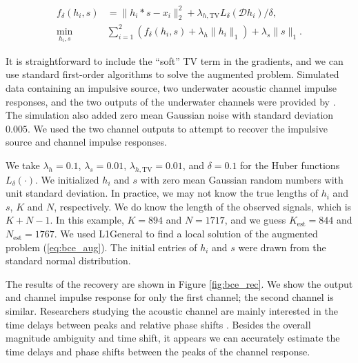 \documentclass[journal]{IEEEtran}
\begin{document}
\begin{align}
   \label{eq:bce_aug}
   f_\delta(h_i,s) &= \|h_i\ast s - x_i\|_2^2 + \lambda_{h,\text{TV}}L_\delta(\mathcal{D}h_i)/\delta,\nonumber\\
   \min_{h_i,s} ~&\sum_{i=1}^2\left(f_\delta(h_i,s) + \lambda_h\|h_i\|_1\right) + \lambda_s\|s\|_1.
\end{align}

It is straightforward to include the ``soft'' TV term in the gradients, and we can use standard first-order algorithms to solve the augmented problem.  Simulated data containing an impulsive source, two underwater acoustic channel impulse responses, and the two outputs of the underwater channels were provided by \cite{rideout_2016}.  The simulation also added zero mean Gaussian noise with standard deviation $0.005$.  We used the two channel outputs to attempt to recover the impulsive source and channel impulse responses.

We take $\lambda_h = 0.1$, $\lambda_s=0.01$, $\lambda_{h,\text{TV}}=0.01$, and $\delta=0.1$ for the Huber functions $L_\delta(\cdot)$.  We initialized $h_i$ and $s$ with zero mean Gaussian random numbers with unit standard deviation.  In practice, we may not know the true lengths of $h_i$ and $s$, $K$ and $N$, respectively.  We do know the length of the observed signals, which is $K+N-1$.  In this example, $K=894$ and $N=1717$, and we guess $K_\text{est}=844$ and $N_\text{est}=1767$.  We used L1General \cite{schmidt_2010} to find a local solution of the augmented problem (\ref{eq:bce_aug}).  The initial entries of $h_i$ and $s$ were drawn from the standard normal distribution.

The results of the recovery are shown in Figure \ref{fig:bce_rec}.  We show the output and channel impulse response for only the first channel; the second channel is similar.  Researchers studying the acoustic channel are mainly interested in the time delays between peaks and relative phase shifts \cite{rideout_2016}.  Besides the overall magnitude ambiguity and time shift, it appears we can accurately estimate the time delays and phase shifts between the peaks of the channel response.
\end{document}
